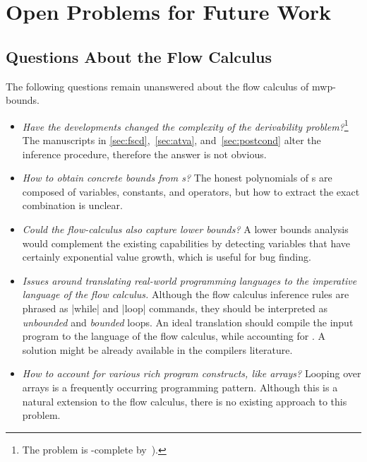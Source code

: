 \section{Open Problems for Future Work}
\label{sec:res-future}

\subsection{Questions About the Flow Calculus}
\label{ssec:mwp-open}

The following questions remain unanswered about the flow calculus of
mwp-bounds.

\begin{itemize}
\item \emph{Have the developments changed the complexity of the derivability
        problem?}\footnote{The problem is -complete by~\cite[p.
        37]{jones2009}).}
      The manuscripts in \autoref{sec:fscd},~\autoref{sec:atva},
      and~\autoref{sec:postcond} alter the inference procedure, therefore the
      answer is not obvious.

\item \emph{How to obtain concrete bounds from s?}
      The honest polynomials of s are composed of variables,
      constants, and operators, but how to extract the exact combination is
      unclear.

\item \emph{Could the flow-calculus also capture lower bounds?}
      A lower bounds analysis would complement the existing capabilities by
      detecting variables that have certainly exponential value growth, which
      is useful \eg for bug finding.

\item \emph{Issues around translating real-world programming languages to the
      imperative language of the flow calculus.}
      Although the flow calculus inference rules are phrased as \pr|while| and
      \pr|loop| commands, they should be interpreted as \emph{unbounded} and
      \emph{bounded} loops. An ideal translation should compile the input
      program to the language of the flow calculus, while accounting for . A solution might be already available in the
      compilers literature.

\item \emph{How to account for various rich program constructs,
      like arrays?}
     Looping over arrays is a frequently occurring programming pattern.
     Although this is a natural extension to the flow calculus,
     there is no existing approach to this problem.

\end{itemize}

